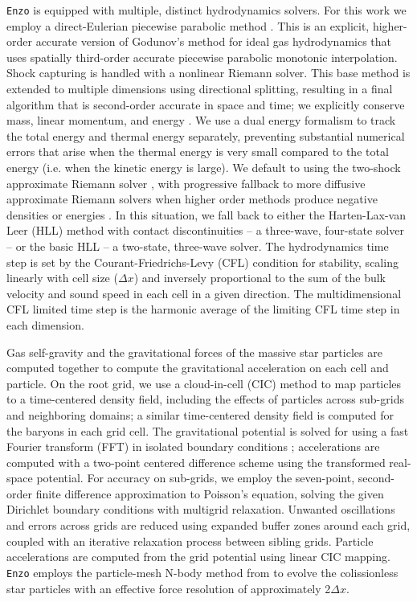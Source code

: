 \documentclass[11pt]{article}
\begin{document}
\texttt{Enzo} is equipped with multiple, distinct hydrodynamics solvers. For this work we employ a direct-Eulerian piecewise parabolic method \citep{ColellaWoodward1984, Bryan1995}. This is an explicit, higher-order accurate version of Godunov's method for ideal gas hydrodynamics that uses spatially third-order accurate piecewise parabolic monotonic interpolation. Shock capturing is handled with a nonlinear Riemann solver. This base method is extended to multiple dimensions using directional splitting, resulting in a final algorithm that is second-order accurate in space and time; we explicitly conserve mass, linear momentum, and energy \citep{Hawley1984, NormanWinkler1986}. We use a dual energy formalism to track the total energy and thermal energy separately, preventing substantial numerical errors that arise when the thermal energy is very small compared to the total energy (i.e. when the kinetic energy is large). We default to using the two-shock approximate Riemann solver \citep{Toro1997}, with progressive fallback to more diffusive approximate Riemann solvers when higher order methods produce negative densities or energies \citep{LemasterStone2009}. In this situation, we fall back to either the Harten-Lax-van Leer (HLL) \citep{Toro1997} method with contact discontinuities -- a three-wave, four-state solver -- or the basic HLL -- a two-state, three-wave solver. The hydrodynamics time step is set by the Courant-Friedrichs-Levy (CFL) condition for stability, scaling linearly with cell size ($\Delta x$) and inversely proportional to the sum of the bulk velocity and sound speed in each cell in a given direction. The multidimensional CFL limited time step is the harmonic average of the limiting CFL time step in each dimension. 

Gas self-gravity and the gravitational forces of the massive star particles are computed together to compute the gravitational acceleration on each cell and particle. On the root grid, we use a cloud-in-cell (CIC) method \citep{HockneyEastwood1988} to map particles to a time-centered density field, including the effects of particles across sub-grids and neighboring domains; a similar time-centered density field is computed for the baryons in each grid cell. The gravitational potential is solved for using a fast Fourier transform (FFT) in isolated boundary conditions \citep{James1977}; accelerations are computed with a two-point centered difference scheme using the transformed real-space potential. For accuracy on sub-grids, we employ the seven-point, second-order finite difference approximation to Poisson's equation, solving the given Dirichlet boundary conditions with multigrid relaxation. Unwanted oscillations and errors across grids are reduced using expanded buffer zones around each grid, coupled with an iterative relaxation process between sibling grids. Particle accelerations are computed from the grid potential using linear CIC mapping. \texttt{Enzo} employs the particle-mesh N-body method from \cite{HockneyEastwood1988} to evolve the colissionless star particles with an effective force resolution of approximately 2$\Delta x$.
\end{document}
